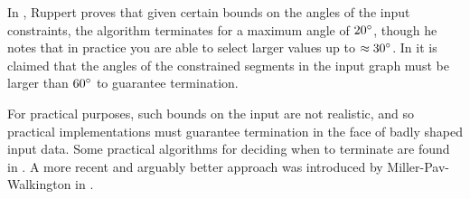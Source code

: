 \documentclass[10pt,a4paper]{article}
\begin{document}
In \cite{ruppert}, Ruppert proves that given certain bounds on the angles of the input constraints, the algorithm terminates for a maximum angle of $20 \degree$, though he notes that in practice you are able to select larger values up to $\approx 30 \degree$. In \cite{shewchuk} it is claimed that the angles of the constrained segments in the input graph must be larger than $60 \degree$ to guarantee termination.

For practical purposes, such bounds on the input are not realistic, and so practical implementations must guarantee termination in the face of badly shaped input data. Some practical algorithms for deciding when to terminate are found in \cite{shewchuk}. A more recent and arguably better approach was introduced by Miller-Pav-Walkington in \cite{miller}.
\end{document}
